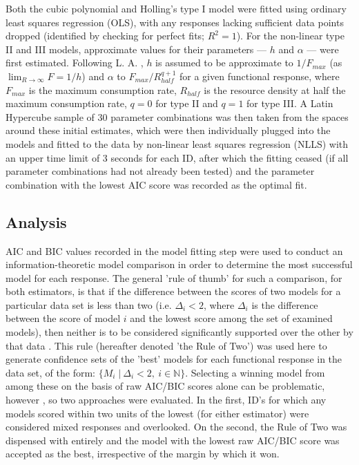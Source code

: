 \documentclass[11pt]{article}
\begin{document}
    Both the cubic polynomial and Holling's type I model were fitted using ordinary least squares regression (OLS), with any responses lacking sufficient data points dropped (identified by checking for perfect fits; $R^2=1$). For the non-linear type II and III models, approximate values for their parameters — $h$ and $\alpha$ — were first estimated. Following L. A. \citet{real1977kinetics}, $h$ is assumed to be approximate to $1/F_{max}$ (as $\lim_{R\to\infty}F=1/h$) and $\alpha$ to $F_{max}/R_{half}^{q+1}$ for a given functional response, where $F_{max}$ is the maximum consumption rate,  $R_{half}$ is the resource density at half the maximum consumption rate, $q=0$ for type II and $q=1$ for type III. A Latin Hypercube sample of 30 parameter combinations was then taken from the spaces around these initial estimates, which were then individually plugged into the models and fitted to the data by non-linear least squares regression (NLLS) with an upper time limit of 3 seconds for each ID, after which the fitting ceased (if all parameter combinations had not already been tested) and the parameter combination with the lowest AIC score was recorded as the optimal fit.
    
    \subsection{Analysis}
    
    AIC and BIC values recorded in the model fitting step were used to conduct an information-theoretic model comparison in order to determine the most successful model for each response. The general 'rule of thumb' for such a comparison, for both estimators, is that if the difference between the scores of two models for a particular data set is less than two  (i.e.  $\Delta_i<2$, where $\Delta_i$ is the difference between the score of model $i$ and the lowest score among the set of examined models), then neither is to be considered significantly supported over the other by that data \citep{anderson2004model}. This rule (hereafter denoted 'the Rule of Two') was used here to generate confidence sets of the 'best' models for each functional response in the data set, of the form: $\{M_{i}\;|\:\Delta _{i} < 2,\:i\in\mathbb{N}\}$. Selecting a winning model from among these on the basis of raw AIC/BIC scores alone can be problematic, however \citep{wagenmakers2004aic}, so two approaches were evaluated. In the first, ID's for which any models scored within two units of the lowest (for either estimator) were considered mixed responses and overlooked. On the second, the Rule of Two was dispensed with entirely and the model with the lowest raw AIC/BIC score was accepted as the best, irrespective of the margin by which it won.
    
\end{document}
